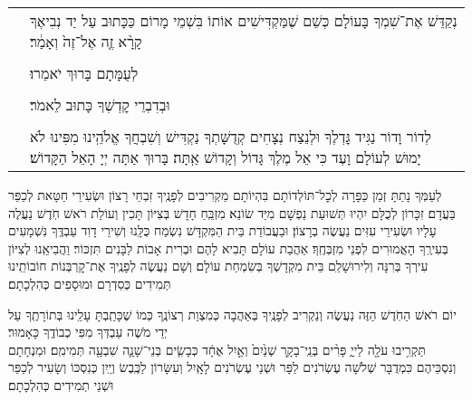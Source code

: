 \documentclass[twoside, openany, parskip=half, 11pt]{book}
\begin{document}
\newcommand{\kedusmusafchol}[2]{
\ssubsection{\adforn{48} #1 \adforn{22}}

\begin{small}
\begin{tabular}{l p{.85\textwidth}}

\shatz &
נְקַדֵּשׁ אֶת־שִׁמְךָ בָּעוֹלָם כְּשֵׁם שֶׁמַּקְדִּישִׁים אוֹתוֹ בִּשְׁמֵי מָרוֹם כַּכָּתוּב עַל יַד נְבִיאֶךָ קָרָ֨א זֶ֤ה אֶל־זֶה֙ וְאָמַ֔ר׃\\

\shatzvkahal &
\kadoshkadoshkadosh \\

\shatz &
לְעֻמָּתָם בָּרוּךְ יֹאמֵרוּ׃\\

\shatzvkahal &
\barukhhashem\\

\shatz &
וּבְדִבְרֵי קׇדְשְׁךָ כָּתוּב לֵאמֹר׃ \\

\shatzvkahal &
\yimloch\\

\shatz &
לְדוֹר וָדוֹר נַגִּיד גׇּדְלֶךָ וּלְנֵצַח נְצָחִים קְדֻשָּׁתְךָ נַקְדִּישׁ וְשִׁבְחֲךָ אֱלֹהֵֽינוּ מִפִּינוּ לֹא יָמוּשׁ לְעוֹלָם וָעֶד כִּי אֵל מֶלֶךְ גָּדוֹל וְקָדוֹשׁ אַֽתָּה׃ בָּרוּךְ אַתָּה יְיָ הָאֵל הַקָּדוֹשׁ׃ #2\\
\end{tabular}

\end{small}}

\nextpage

\kedusmusafchol{קדושה}{}

לְעַמְּךָ נָתַתָּ זְמַן כַּפָּרָה לְכׇל־תּוֹלְדוֹתָם בִּהְיוֹתָם מַקְרִיבִים לְפָנֶֽיךָ זִבְחֵי רָצוֹן וּשְׂעִירֵי חַטָּאת לְכַפֵּר בַּעֲדָם׃ זִכָּרוֹן לְכֻלָּם יִהְיוּ תְּשׁוּעַת נַפְשָׁם מִיַּד שׂוֹנֵא׃ מִזְבֵּֽחַ חָדָשׁ בְּצִיּוֹן תָּכִין וְעוֹלַת רֹאשׁ חֹֽדֶשׁ נַעֲלֶה עָלָיו וּשְׂעִירֵי עִזִּים נַעֲשֶׂה בְרָצוֹן׃ וּבַעֲבוֹדַת בֵּית הַמִּקְדָּשׁ נִשְׂמַח כֻּלָּֽנוּ וְשִׁירֵי דָוִד עַבְדֶּֽךָ נִּשְׁמָעִים בְּעִירֶֽךָ הָאֲמוּרִים לִפְנֵי מִזְבְּחֶֽךָ׃ אַהֲבַת עוֹלָם תָּבִיא לָהֶם וּבְרִית אָבוֹת לַבָּנִים תִּזְכּוֹר׃ וַהֲבִיאֵֽנוּ לְצִיּוֹן עִירְךָ בְּרִנָּה וְלִירוּשָׁלַ‍ִם בֵּית מִקְדָשְׁךָ בְּשִׂמְחַת עוֹלָם׃ וְשָׁם נַעֲשֶׂה לְפָנֶֽיךָ אֶת־קׇרְבְּנוֹת חוֹבוֹתֵֽינוּ תְּמִידִים כְּסִדְרָם וּמוּסָפִים כְּהִלְכָתָם׃

יוֹם רֹאשׁ הַחֹֽדֶשׁ
הַזֶּה נַעֲשֶׂה וְנַקְרִיב לְפָנֶֽיךָ בְּאַהֲבָה כְּמִצְוַת רְצוֹנֶֽךָ כְּמוֹ שֶׁכָּתַֽבְתָּ עָלֵֽינוּ בְּתוֹרָתֶֽךָ עַל יְדֵי מֹשֶׁה עַבְדְּךָ מִפִּי כְבוֹדֶֽךָ כָּאָמוּר׃\\
תַּקְרִ֥יבוּ עֹלָ֖ה לַייָ֑ פָּרִ֨ים בְּנֵֽי־בָקָ֤ר שְׁנַ֙יִם֙ וְאַ֣יִל אֶחָ֔ד כְּבָשִׂ֧ים בְּנֵי־שָׁנָ֛ה שִׁבְעָ֖ה תְּמִימִֽם׃ וּמִנְחָתָם וְנִסְכֵּיהֶם כִּמְדֻבָּר שְׁלֹשָׁה עֶשְׂרֹנִים לַפָּר וּשְׁנֵי עֶשְׂרֹנִים לָאָֽיִל וְעִשָּׂרוֹן לַכֶּֽבֶשׂ וְיַֽיִן כְּנִסְכּוֹ וְשָׂעִיר לְכַפֵּר וּשְׁנֵי תְמִידִים כְּהִלְכָתָם׃
\end{document}
